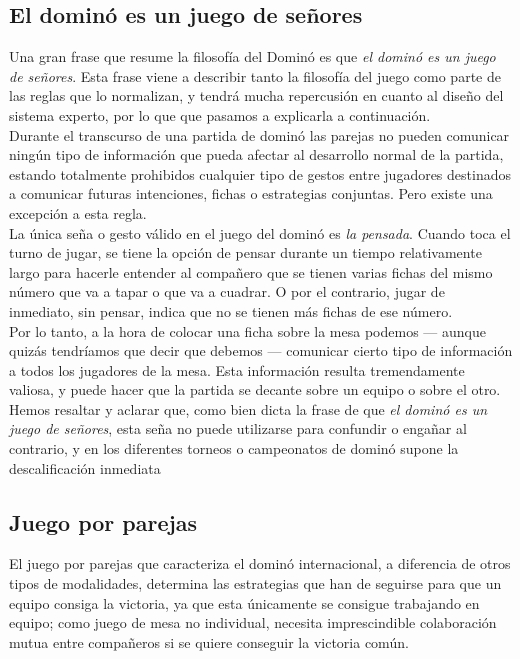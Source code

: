 \subsection{El dominó es un juego de señores}

Una gran frase que resume la filosofía del Dominó es que \emph{el dominó es un juego de señores}. Esta frase
viene a describir tanto la filosofía del juego como parte de las reglas que lo normalizan, y tendrá mucha
repercusión en cuanto al diseño del sistema experto, por lo que que pasamos a explicarla a continuación. \\

Durante el transcurso de una partida de dominó las parejas no pueden comunicar ningún tipo de información
que pueda afectar al desarrollo normal de la partida, estando totalmente prohibidos cualquier tipo de gestos
entre jugadores destinados a comunicar futuras intenciones, fichas o estrategias conjuntas. Pero existe
una excepción a esta regla. \\

La única seña o gesto válido en el juego del dominó es \emph{la pensada}. Cuando toca el turno de jugar, se tiene la
opción de pensar durante un tiempo relativamente largo para hacerle entender al compañero que se tienen
varias fichas del mismo número que va a tapar o que va a cuadrar. O por el contrario, jugar de inmediato,
sin pensar, indica que no se tienen más fichas de ese número. \\

Por lo tanto, a la hora de colocar una ficha sobre la mesa podemos --- aunque quizás tendríamos que decir que 
debemos --- comunicar cierto tipo de información a todos los jugadores de la mesa. Esta información resulta
tremendamente valiosa, y puede hacer que la partida se decante sobre un equipo o sobre el otro. \\

Hemos resaltar y aclarar que, como bien dicta la frase de que \emph{el dominó es un juego de señores},
esta seña no puede utilizarse para confundir o engañar al contrario, y en los diferentes torneos o campeonatos
de dominó supone la descalificación inmediata


\subsection{Juego por parejas}

El juego por parejas que caracteriza el dominó internacional, a diferencia de otros tipos de modalidades,
determina las estrategias que han de seguirse para que un equipo consiga la victoria, ya que esta únicamente
se consigue trabajando en equipo; como juego de mesa no individual, necesita imprescindible colaboración
mutua entre compañeros si se quiere conseguir la victoria común. \\

